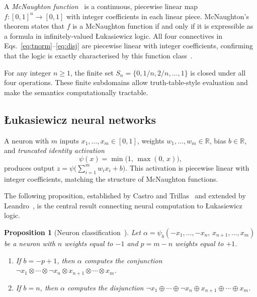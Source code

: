 \documentclass[10pt,a4paper,twoside]{article}
\newtheorem{proposition}[theorem]{Proposition}
\newcommand{\tnorm}{\otimes}      %
\newcommand{\disj}{\oplus}        %
\begin{document}
A \emph{McNaughton function}~\cite{mcnaughton1951} is a continuous, piecewise
linear map $f\colon [0,1]^n \to [0,1]$ with integer coefficients in each linear
piece.
McNaughton's theorem states that $f$ is a McNaughton function if and only if
it is expressible as a formula in infinitely-valued \L{}ukasiewicz logic.
All four connectives in Eqs.~\eqref{eq:tnorm}--\eqref{eq:disj} are
piecewise linear with integer coefficients, confirming that the logic is
exactly characterised by this function class~\cite{mundici1986}.

For any integer $n \geq 1$, the finite set
$S_n = \{0, 1/n, 2/n, \ldots, 1\}$ is closed under all four operations.
These finite subdomains allow truth-table-style evaluation and make the
semantics computationally tractable.

\subsection{\L{}ukasiewicz neural networks}
\label{ssec:lnn}

A neuron with $m$ inputs $x_1, \ldots, x_m \in [0,1]$, weights
$w_1, \ldots, w_m \in \mathbb{R}$, bias $b \in \mathbb{R}$, and
\emph{truncated identity activation}
\begin{equation}
  \psi(x) = \min\!\bigl(1,\, \max(0,\, x)\bigr),
  \label{eq:psi}
\end{equation}
produces output $z = \psi\!\bigl(\sum_{i=1}^m w_i x_i + b\bigr)$.
This activation is piecewise linear with integer coefficients, matching the
structure of McNaughton functions.

The following proposition, established by Castro and
Trillas~\cite{castro1998} and extended by Leandro~\cite{leandro2009},
is the central result connecting neural computation to \L{}ukasiewicz logic.

\begin{proposition}[Neuron classification~\cite{castro1998,leandro2009}]
\label{prop:classif}
Let $\alpha = \psi_b(-x_1, \ldots, -x_n,\, x_{n+1}, \ldots, x_m)$
be a neuron with $n$ weights equal to $-1$ and $p = m - n$ weights equal to
$+1$.
\begin{enumerate}
  \item If $b = -p + 1$, then $\alpha$ computes the \emph{conjunction}
    $\neg x_1 \tnorm \cdots \tnorm \neg x_n \tnorm x_{n+1}
     \tnorm \cdots \tnorm x_m$.
  \item If $b = n$, then $\alpha$ computes the \emph{disjunction}
    $\neg x_1 \disj \cdots \disj \neg x_n \disj x_{n+1}
     \disj \cdots \disj x_m$.
\end{enumerate}
\end{proposition}
\end{document}
